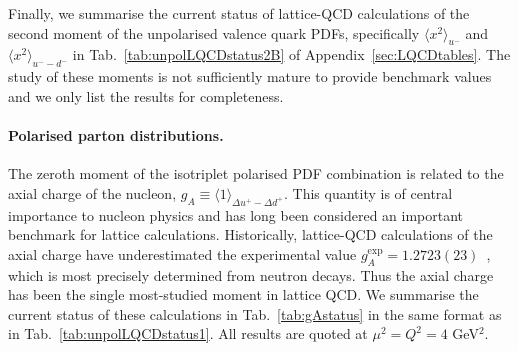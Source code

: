 Finally, we summarise the current status of lattice-QCD calculations of the 
second moment of the unpolarised valence quark PDFs, specifically 
$\langle x^2 \rangle_{u^-}$ and $\langle x^2\rangle_{u^--d^-}$
in Tab.~\ref{tab:unpolLQCDstatus2B} of Appendix~\ref{sec:LQCDtables}.
% 
The study of these moments is not sufficiently mature to provide benchmark 
values and we only list the results for completeness.

\paragraph{Polarised parton distributions.}
The zeroth moment of the isotriplet polarised PDF combination is related to the 
axial charge of the nucleon, $g_A\equiv \langle 1\rangle_{\Delta u^+-\Delta d^+}$.
%
This quantity is of central importance to nucleon physics and has long been 
considered an important benchmark for lattice calculations. 
%
Historically, lattice-QCD calculations of the axial charge have underestimated 
the experimental value $g_A^{\mathrm{exp}} = 1.2723(23)$~\cite{Olive:2016xmw}, 
which is most precisely determined from neutron decays. 
%
Thus the axial charge has been the single most-studied moment in lattice QCD.
%
We summarise the current status of these calculations in 
Tab.~\ref{tab:gAstatus} in the same format as in 
Tab.~\ref{tab:unpolLQCDstatus1}.
%
All results are quoted at $\mu^2=Q^2=4$ GeV$^2$.

